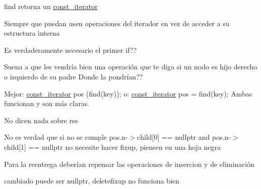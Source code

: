 
\begin{DoxyRefList}
\item[\label{bug__bug000005}%
\hypertarget{bug__bug000005}{}%
Miembro \hyperlink{classaed2_1_1map_a0b0a11f906da2926f9eb342fcee79fd7_a0b0a11f906da2926f9eb342fcee79fd7}{aed2\+:\+:map$<$ Key, Meaning, Compare $>$\+:\+:at} (const Key \&key) const ]find retorna un \hyperlink{classaed2_1_1map_1_1const__iterator}{const\+\_\+iterator} 

Siempre que puedan usen operaciones del iterador en vez de acceder a su estructura interna 
\item[\label{bug__bug000018}%
\hypertarget{bug__bug000018}{}%
Miembro \hyperlink{classaed2_1_1map_a2bfa5165825979bf2431db55bc6bc9ca_a2bfa5165825979bf2431db55bc6bc9ca}{aed2\+:\+:map$<$ Key, Meaning, Compare $>$\+:\+:clear} ()]Es verdaderamente necesario el primer if?? 
\item[\label{bug__bug000021}%
\hypertarget{bug__bug000021}{}%
Miembro \hyperlink{classaed2_1_1map_af2eed16fe5e8bdbe5a9d979a5d136732_af2eed16fe5e8bdbe5a9d979a5d136732}{aed2\+:\+:map$<$ Key, Meaning, Compare $>$\+:\+:delete\+Fix\+Up} (\hyperlink{structaed2_1_1map_1_1Node}{Node} $\ast$nodo)]Suena a que les vendría bien una operación que te diga si un nodo es hijo derecho o izquierdo de su padre Donde la pondrían?? 
\item[\label{bug__bug000017}%
\hypertarget{bug__bug000017}{}%
Miembro \hyperlink{classaed2_1_1map_a2ffadb42cd5f0bc7b3752ff159b75334_a2ffadb42cd5f0bc7b3752ff159b75334}{aed2\+:\+:map$<$ Key, Meaning, Compare $>$\+:\+:erase} (const Key \&key)]Mejor\+: \hyperlink{classaed2_1_1map_1_1const__iterator}{const\+\_\+iterator} pos (find(key)); o\+: \hyperlink{classaed2_1_1map_1_1const__iterator}{const\+\_\+iterator} pos = find(key); Ambas funcionan y son más claras. 
\item[\label{bug__bug000015}%
\hypertarget{bug__bug000015}{}%
Miembro \hyperlink{classaed2_1_1map_ad8e796bf9c9c558e5ce6b61e116253fe_ad8e796bf9c9c558e5ce6b61e116253fe}{aed2\+:\+:map$<$ Key, Meaning, Compare $>$\+:\+:erase} (\hyperlink{classaed2_1_1map_1_1const__iterator}{const\+\_\+iterator} pos)]No dicen nada sobre res 

No es verdad que si no se cumple pos.\+n-\/$>$child\mbox{[}0\mbox{]} == nullptr and pos.\+n-\/$>$child\mbox{[}1\mbox{]} == nullptr no necesite hacer fixup, piensen en una hoja negra 

Para la reentrega deberían repensar las operaciones de insercion y de eliminación 

cambiado puede ser nullptr, deletefixup no funciona bien


\end{DoxyRefList}
